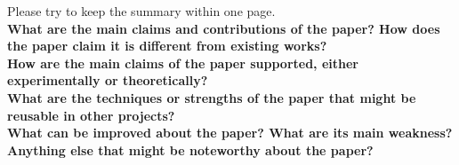 \documentclass[11pt]{article}
\begin{document}
Please try to keep the summary within one page.
\\

\textbf{What are the main claims and contributions of the paper? How does the paper claim it is different from existing works?}
\\

\textbf{How are the main claims of the paper supported, either experimentally or theoretically?}
\\

\textbf{What are the techniques or strengths of the paper that might be reusable in other projects?}
\\

\textbf{What can be improved about the paper? What are its main weakness?}
\\

\textbf{Anything else that might be noteworthy about the paper?}
\\
\end{document}
